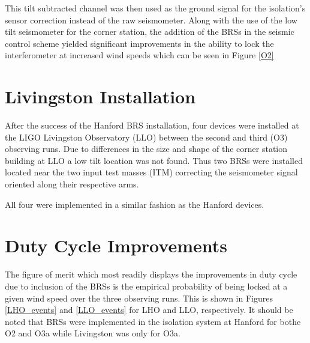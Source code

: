 \documentclass [12pt, proquest]{uwthesis}[2019]
\begin{document}
This tilt subtracted channel was then used as the ground signal for the isolation's sensor correction instead of the raw seismometer. Along with the use of the low tilt seismometer for the corner station, the addition of the BRSs in the seismic control scheme yielded significant improvements in the ability to lock the interferometer at increased wind speeds which can be seen in Figure \ref{O2}


\section{Livingston Installation}

\quad After the success of the Hanford BRS installation, four devices were installed at the LIGO Livingston Observatory (LLO) between the second and third (O3) observing runs. Due to differences in the size and shape of the corner station building at LLO a low tilt location was not found. Thus two BRSs were installed located near the two input test masses (ITM) correcting the seismometer signal oriented along their respective arms. 

All four were implemented in a similar fashion as the Hanford devices.

\section{Duty Cycle Improvements}

The figure of merit which most readily displays the improvements in duty cycle due to inclusion of the BRSs is the empirical probability of being locked at a given wind speed over the three observing runs. This is shown in Figures \ref{LHO_events} and \ref{LLO_events} for LHO and LLO, respectively. It should be noted that BRSs were implemented in the isolation system at Hanford for bothe O2 and O3a while Livingston was only for O3a.
\end{document}
